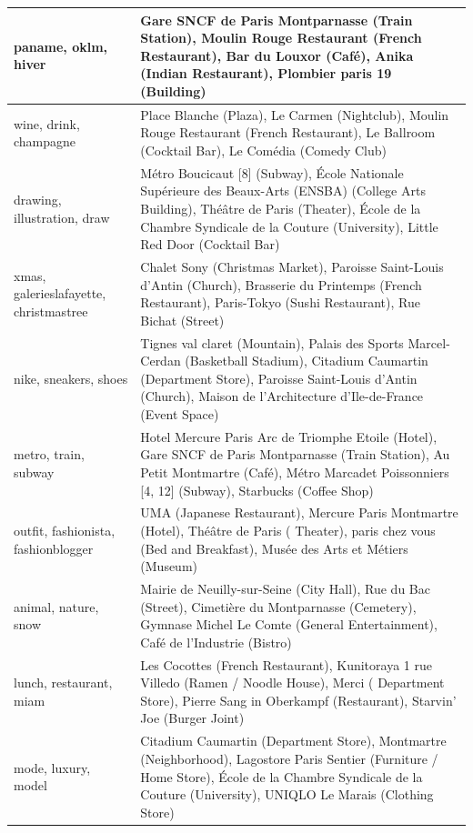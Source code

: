 \begin{longtable}{|p{2in}|p{3in}|}
  paname, oklm, hiver & Gare SNCF de Paris Montparnasse (Train Station), Moulin Rouge Restaurant (French Restaurant), Bar du  Louxor (Café), Anika (Indian Restaurant), Plombier paris 19 (Building) \\ \hline 
  wine, drink, champagne & Place Blanche (Plaza), Le Carmen (Nightclub), Moulin Rouge Restaurant (French Restaurant), Le  Ballroom (Cocktail Bar), Le Comédia (Comedy Club) \\ \hline 
  drawing, illustration, draw & Métro Boucicaut [8] (Subway), École Nationale Supérieure des Beaux-Arts (ENSBA) (College Arts   Building), Théâtre de Paris (Theater), École de la Chambre Syndicale de la Couture (University), Little Red Door (Cocktail  Bar) \\ \hline 
  xmas, galerieslafayette, christmastree & Chalet Sony (Christmas Market), Paroisse Saint-Louis d'Antin (Church), Brasserie du  Printemps (French Restaurant), Paris-Tokyo (Sushi Restaurant), Rue Bichat (Street) \\ \hline 
  nike, sneakers, shoes & Tignes val claret (Mountain), Palais des Sports Marcel-Cerdan (Basketball Stadium), Citadium  Caumartin (Department Store), Paroisse Saint-Louis d'Antin (Church), Maison de l'Architecture d'Ile-de-France (Event Space)  \\ \hline 
  metro, train, subway & Hotel Mercure Paris Arc de Triomphe Etoile (Hotel), Gare SNCF de Paris Montparnasse (Train Station),   Au Petit Montmartre (Café), Métro Marcadet Poissonniers [4, 12] (Subway), Starbucks (Coffee Shop) \\ \hline 
  outfit, fashionista, fashionblogger & UMA (Japanese Restaurant), Mercure Paris Montmartre (Hotel), Théâtre de Paris ( Theater), paris chez vous (Bed and Breakfast), Musée des Arts et Métiers (Museum) \\ \hline 
  animal, nature, snow & Mairie de Neuilly-sur-Seine (City Hall), Rue du Bac (Street), Cimetière du Montparnasse (Cemetery),  Gymnase Michel Le Comte (General Entertainment), Café de l'Industrie (Bistro) \\ \hline 
  lunch, restaurant, miam & Les Cocottes (French Restaurant), Kunitoraya 1 rue Villedo (Ramen / Noodle House), Merci (  Department Store), Pierre Sang in Oberkampf (Restaurant), Starvin' Joe (Burger Joint) \\ \hline 
  mode, luxury, model & Citadium Caumartin (Department Store), Montmartre (Neighborhood), Lagostore Paris Sentier (Furniture /  Home Store), École de la Chambre Syndicale de la Couture (University), UNIQLO Le Marais (Clothing Store) \\ \hline 

\end{longtable}
